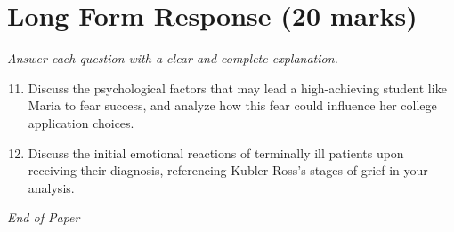 \documentclass[12pt]{article}
\begin{document}
\section*{Long Form Response (20 marks)}
\textit{Answer each question with a clear and complete explanation.}
\begin{enumerate}[label=\arabic*.]
\setcounter{enumi}{10}
\item Discuss the psychological factors that may lead a high-achieving student like Maria to
fear success, and analyze how this fear could influence her college application choices.
\item Discuss the initial emotional reactions of terminally ill patients upon receiving their
diagnosis, referencing Kubler-Ross's stages of grief in your analysis.
\end{enumerate}

\vfill
\noindent\textit{End of Paper}
\end{document}
